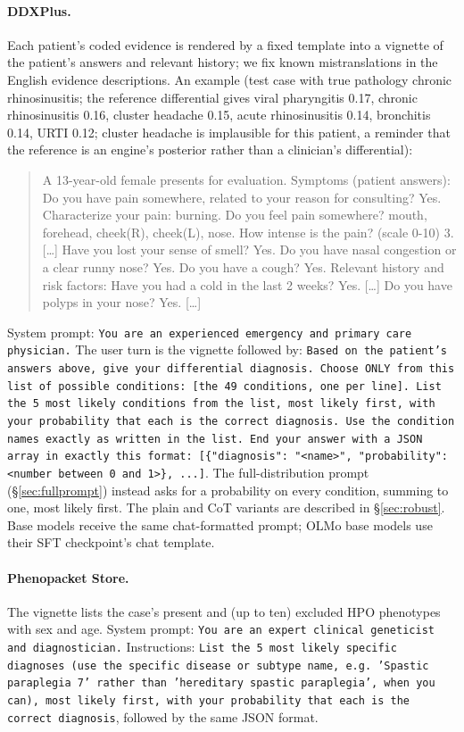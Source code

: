 \documentclass[wcp]{jmlr}
\begin{document}
\paragraph{DDXPlus.} Each patient's coded evidence is rendered by a fixed template into a vignette of the patient's answers and relevant history; we fix known mistranslations in the English evidence descriptions. An example (test case with true pathology chronic rhinosinusitis; the reference differential gives viral pharyngitis 0.17, chronic rhinosinusitis 0.16, cluster headache 0.15, acute rhinosinusitis 0.14, bronchitis 0.14, URTI 0.12; cluster headache is implausible for this patient, a reminder that the reference is an engine's posterior rather than a clinician's differential):
\begin{quote}\small\ttfamily
A 13-year-old female presents for evaluation. Symptoms (patient answers): Do you have pain somewhere, related to your reason for consulting? Yes. Characterize your pain: burning. Do you feel pain somewhere? mouth, forehead, cheek(R), cheek(L), nose. How intense is the pain? (scale 0-10) 3. [\dots] Have you lost your sense of smell? Yes. Do you have nasal congestion or a clear runny nose? Yes. Do you have a cough? Yes. Relevant history and risk factors: Have you had a cold in the last 2 weeks? Yes. [\dots] Do you have polyps in your nose? Yes. [\dots]
\end{quote}
System prompt: \texttt{You are an experienced emergency and primary care physician.} The user turn is the vignette followed by: \texttt{Based on the patient's answers above, give your differential diagnosis. Choose ONLY from this list of possible conditions: [the 49 conditions, one per line]. List the 5 most likely conditions from the list, most likely first, with your probability that each is the correct diagnosis. Use the condition names exactly as written in the list. End your answer with a JSON array in exactly this format: [\{"diagnosis": "<name>", "probability": <number between 0 and 1>\}, ...]}. The full-distribution prompt (\S\ref{sec:fullprompt}) instead asks for a probability on every condition, summing to one, most likely first. The plain and CoT variants are described in \S\ref{sec:robust}. Base models receive the same chat-formatted prompt; OLMo base models use their SFT checkpoint's chat template.
\paragraph{Phenopacket Store.} The vignette lists the case's present and (up to ten) excluded HPO phenotypes with sex and age. System prompt: \texttt{You are an expert clinical geneticist and diagnostician.} Instructions: \texttt{List the 5 most likely specific diagnoses (use the specific disease or subtype name, e.g.\ 'Spastic paraplegia 7' rather than 'hereditary spastic paraplegia', when you can), most likely first, with your probability that each is the correct diagnosis}, followed by the same JSON format.
\end{document}

